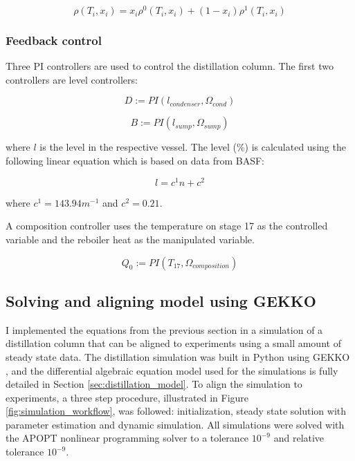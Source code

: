 \begin{equation}
    \rho(T_i, x_i) = x_i\rho^0(T_i, x_i) + (1-x_i)\rho^1(T_i, x_i)
\end{equation}

\subsubsection{Feedback control}

Three PI controllers are used to control the distillation column. The first two controllers are  level controllers:

\begin{equation}
    D := PI(l_{condenser}, \Omega_{cond})
\end{equation}

\begin{equation}
    B := PI(l_{sump}, \Omega_{sump})
\end{equation}

where $l$ is the level in the respective vessel. The level (\%) is calculated using the following linear equation which is based on data from BASF:

\begin{equation}
    l = c^1 n + c^2
\end{equation}

where $c^1=143.94 m^{-1}$ and $c^2=0.21$.

A composition controller uses the temperature on stage 17 as the controlled variable and the reboiler heat as the manipulated variable.

\begin{equation}
    Q_0 := PI(T_{17}, \Omega_{composition})
\end{equation}

\subsection{Solving and aligning model using GEKKO}

I implemented the equations from the previous section in a simulation of a distillation column that can be aligned to experiments using a small amount of steady state data. The distillation simulation was built in Python using GEKKO \cite{Beal2018}, and the differential algebraic equation model used for the simulations is fully detailed in Section \ref{sec:distillation_model}. To align the simulation to experiments, a three step procedure, illustrated in Figure \ref{fig:simulation_workflow}, was followed: initialization, steady state solution with parameter estimation and dynamic simulation. All simulations were solved with the APOPT nonlinear programming solver to a tolerance $10^{-9}$ and relative tolerance $10^{-9}$.

